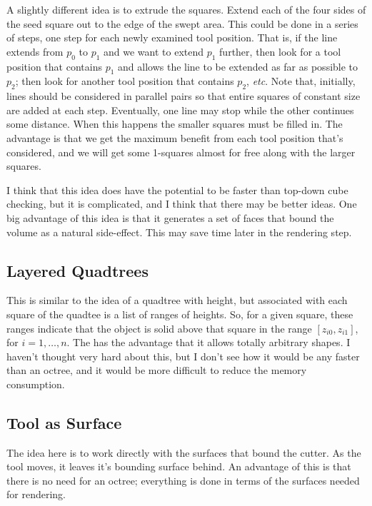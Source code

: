 \documentclass[titlepage,oneside,10pt]{article}
\begin{document}
A slightly different idea is to extrude the squares. Extend each of
the four sides of the seed square out to the edge of the swept
area. This could be done in a series of steps, one step for each newly
examined tool position. That is, if the line extends from $p_0$ to
$p_1$ and we want to extend $p_1$ further, then look for a tool
position that contains $p_1$ and allows the line to be extended as far
as possible to $p_2$; then look for another tool position that
contains $p_2$, \emph{etc}. Note that, initially, lines should be
considered in parallel pairs so that entire squares of constant size
are added at each step. Eventually, one line may stop while the other
continues some distance. When this happens the smaller squares must be
filled in. The advantage is that we get the maximum benefit from each
tool position that's considered, and we will get some 1-squares almost
for free along with the larger squares.

I think that this idea does have the potential to be faster than
top-down cube checking, but it is complicated, and I think that there
may be better ideas. One big advantage of this idea is that it
generates a set of faces that bound the volume as a natural
side-effect. This may save time later in the rendering step.

\subsection{Layered Quadtrees}

This is similar to the idea of a quadtree with height, but associated
with each square of the quadtee is a list of ranges of heights. So,
for a given square, these ranges indicate that the object is solid
above that square in the range $[z_{i0},z_{i1}]$, for
$i=1,\ldots,n$. The has the advantage that it allows totally arbitrary
shapes. I haven't thought very hard about this, but I don't see how it
would be any faster than an octree, and it would be more difficult to
reduce the memory consumption. 

\subsection{Tool as Surface}

The idea here is to work directly with the surfaces that bound the
cutter. As the tool moves, it leaves it's bounding surface behind. An
advantage of this is that there is no need for an octree; everything
is done in terms of the surfaces needed for rendering.
\end{document}
